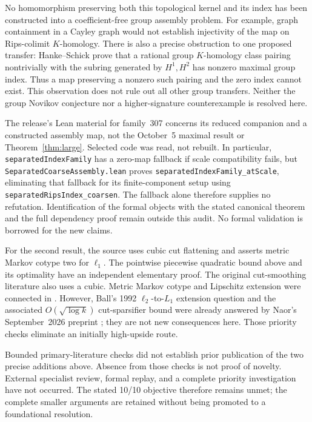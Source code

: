 \documentclass[11pt]{article}
\theoremstyle{remark}\newtheorem{remark}[theorem]{Remark}
\begin{document}
No homomorphism preserving both this topological kernel and its index has
been constructed into a coefficient-free group assembly problem.
For example, graph containment in a Cayley graph would not establish
injectivity of the map on Rips-colimit $K$-homology.
There is also a precise obstruction to one proposed transfer:
Hanke--Schick \cite{HS} prove that a rational group $K$-homology class
pairing nontrivially with the subring generated by $H^1,H^2$ has nonzero
maximal group index. Thus a map preserving a nonzero such pairing and the
zero index cannot exist. This observation does not rule out all other
group transfers. Neither the group Novikov conjecture nor a higher-signature
counterexample is resolved here.

The release's Lean material for family~307 concerns its reduced companion
and a constructed assembly map, not the October~5 maximal result or
Theorem~\ref{thm:large}. Selected code was read, not rebuilt.
In particular, \texttt{separatedIndexFamily} has a zero-map fallback if
scale compatibility fails, but \texttt{SeparatedCoarseAssembly.lean}
proves \texttt{separatedIndexFamily\_atScale}, eliminating that fallback
for its finite-component setup using \texttt{separatedRipsIndex\_coarsen}.
The fallback alone therefore supplies no refutation. Identification of
the formal objects with the stated canonical theorem and the full
dependency proof remain outside this audit. No formal validation is
borrowed for the new claims.

For the second result, the source uses cubic cut flattening and asserts
metric Markov cotype two for $\ell_1$. The pointwise piecewise quadratic
bound above and its optimality have an independent elementary proof.
The original cut-smoothing literature \cite{CWX} also uses a cubic.
Metric Markov cotype and Lipschitz extension were connected in \cite{MN}.
However, Ball's 1992 $\ell_2$-to-$L_1$ extension question and the associated
$O(\sqrt{\log k})$ cut-sparsifier bound were already answered by Naor's
September~2026 preprint \cite{Naor}; they are not new consequences here.
Those priority checks eliminate an initially high-upside route.

Bounded primary-literature checks did not establish prior publication of
the two precise additions above. Absence from those checks is not proof
of novelty. External specialist review, formal replay, and a complete
priority investigation have not occurred. The stated 10/10 objective
therefore remains unmet; the complete smaller arguments are retained
without being promoted to a foundational resolution.
\end{document}
